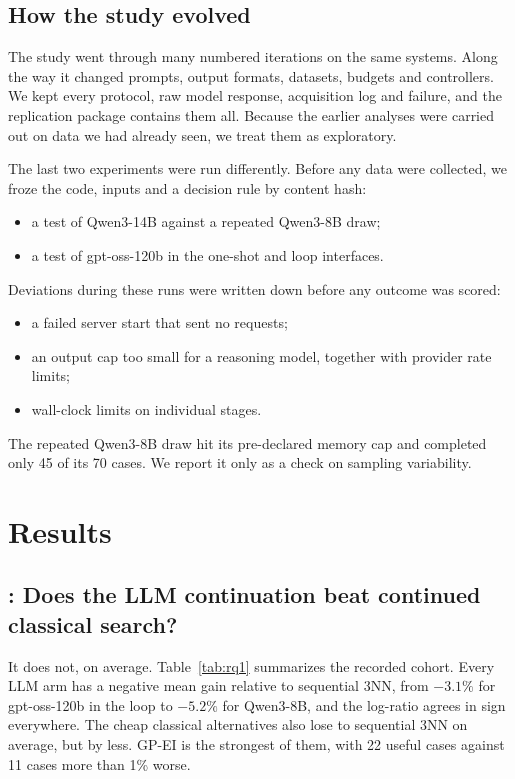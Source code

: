 \subsection{How the study evolved}
\label{sec:history}

The study went through many numbered iterations on the same systems. Along the way it changed prompts, output formats, datasets, budgets and controllers. We kept every protocol, raw model response, acquisition log and failure, and the replication package contains them all. Because the earlier analyses were carried out on data we had already seen, we treat them as exploratory.

The last two experiments were run differently. Before any data were collected, we froze the code, inputs and a decision rule by content hash:
\begin{itemize}
  \item a test of Qwen3-14B against a repeated Qwen3-8B draw;
  \item a test of gpt-oss-120b in the one-shot and loop interfaces.
\end{itemize}
Deviations during these runs were written down before any outcome was scored:
\begin{itemize}
  \item a failed server start that sent no requests;
  \item an output cap too small for a reasoning model, together with provider rate limits;
  \item wall-clock limits on individual stages.
\end{itemize}
The repeated Qwen3-8B draw hit its pre-declared memory cap and completed only 45 of its 70 cases. We report it only as a check on sampling variability.

\section{Results}

\subsection{: Does the LLM continuation beat continued classical search?}
\label{sec:rq1}

It does not, on average. Table~\ref{tab:rq1} summarizes the recorded cohort. Every LLM arm has a negative mean gain relative to sequential 3NN, from $-3.1\%$ for gpt-oss-120b in the loop to $-5.2\%$ for Qwen3-8B, and the log-ratio agrees in sign everywhere. The cheap classical alternatives also lose to sequential 3NN on average, but by less. GP-EI is the strongest of them, with 22 useful cases against 11 cases more than 1\% worse.

